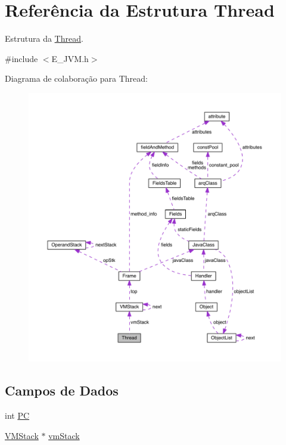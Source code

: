 \hypertarget{struct_thread}{}\section{Referência da Estrutura Thread}
\label{struct_thread}


Estrutura da \hyperlink{struct_thread}{Thread}.  




{\ttfamily \#include $<$E\+\_\+\+J\+V\+M.\+h$>$}



Diagrama de colaboração para Thread\+:
\nopagebreak
\begin{figure}[H]
\begin{center}
\leavevmode
\includegraphics[width=350pt]{struct_thread__coll__graph}
\end{center}
\end{figure}
\subsection*{Campos de Dados}
\begin{DoxyCompactItemize}
\item 
int \hyperlink{struct_thread_acbbbde7dd2d37d9536513e2cdbae37f6}{P\+C}
\item 
\hyperlink{struct_v_m_stack}{V\+M\+Stack} $\ast$ \hyperlink{struct_thread_a14942cb194dc5185288e629c6da5ac3a}{vm\+Stack}
\end{DoxyCompactItemize}


